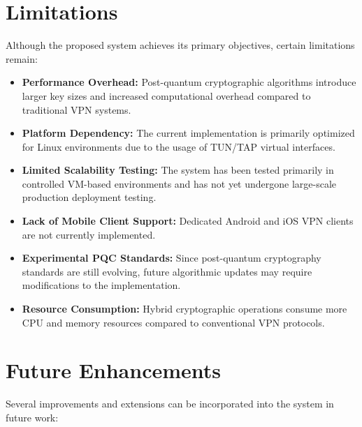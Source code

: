 \section{Limitations}

Although the proposed system achieves its primary objectives, certain limitations remain:

\begin{itemize}

    \item \textbf{Performance Overhead:}
    Post-quantum cryptographic algorithms introduce larger key sizes and increased computational overhead compared to traditional VPN systems.

    \item \textbf{Platform Dependency:}
    The current implementation is primarily optimized for Linux environments due to the usage of TUN/TAP virtual interfaces.

    \item \textbf{Limited Scalability Testing:}
    The system has been tested primarily in controlled VM-based environments and has not yet undergone large-scale production deployment testing.

    \item \textbf{Lack of Mobile Client Support:}
    Dedicated Android and iOS VPN clients are not currently implemented.

    \item \textbf{Experimental PQC Standards:}
    Since post-quantum cryptography standards are still evolving, future algorithmic updates may require modifications to the implementation.

    \item \textbf{Resource Consumption:}
    Hybrid cryptographic operations consume more CPU and memory resources compared to conventional VPN protocols.

\end{itemize}

\section{Future Enhancements}

Several improvements and extensions can be incorporated into the system in future work:

